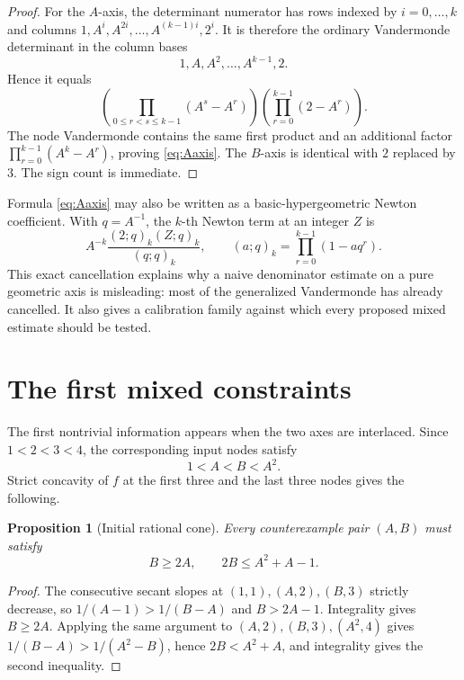 \documentclass[11pt]{article}
\newtheorem{proposition}[theorem]{Proposition}
\theoremstyle{definition}
\theoremstyle{remark}
\begin{document}
\begin{proof}
For the $A$-axis, the determinant numerator has rows indexed by $i=0,\ldots,k$ and columns
$1,A^i,A^{2i},\ldots,A^{(k-1)i},2^i$.  It is therefore the ordinary Vandermonde determinant
in the column bases
\[
 1,A,A^2,\ldots,A^{k-1},2.
\]
Hence it equals
\[
 \left(\prod_{0\le r<s\le k-1}(A^s-A^r)\right)
 \left(\prod_{r=0}^{k-1}(2-A^r)\right).
\]
The node Vandermonde contains the same first product and an additional factor
$\prod_{r=0}^{k-1}(A^k-A^r)$, proving \eqref{eq:Aaxis}.  The $B$-axis is identical with
$2$ replaced by $3$.  The sign count is immediate.
\end{proof}

Formula \eqref{eq:Aaxis} may also be written as a basic-hypergeometric Newton coefficient.
With $q=A^{-1}$, the $k$-th Newton term at an integer $Z$ is
\begin{equation}\label{eq:qnewton}
 A^{-k}\frac{(2;q)_k(Z;q)_k}{(q;q)_k},
 \qquad (a;q)_k=\prod_{r=0}^{k-1}(1-aq^r).
\end{equation}
This exact cancellation explains why a naive denominator estimate on a pure geometric axis
is misleading: most of the generalized Vandermonde has already cancelled.  It also gives a
calibration family against which every proposed mixed estimate should be tested.

\section{The first mixed constraints}

The first nontrivial information appears when the two axes are interlaced.  Since
$1<2<3<4$, the corresponding input nodes satisfy
\[
 1<A<B<A^2.
\]
Strict concavity of $f$ at the first three and the last three nodes gives the following.

\begin{proposition}[Initial rational cone]\label{prop:cone}
Every counterexample pair $(A,B)$ must satisfy
\begin{equation}\label{eq:cone}
 B\ge 2A,\qquad 2B\le A^2+A-1.
\end{equation}
\end{proposition}

\begin{proof}
The consecutive secant slopes at $(1,1),(A,2),(B,3)$ strictly decrease, so
$1/(A-1)>1/(B-A)$ and $B>2A-1$.  Integrality gives $B\ge2A$.  Applying the same argument to
$(A,2),(B,3),(A^2,4)$ gives $1/(B-A)>1/(A^2-B)$, hence $2B<A^2+A$, and integrality gives the
second inequality.
\end{proof}
\end{document}
